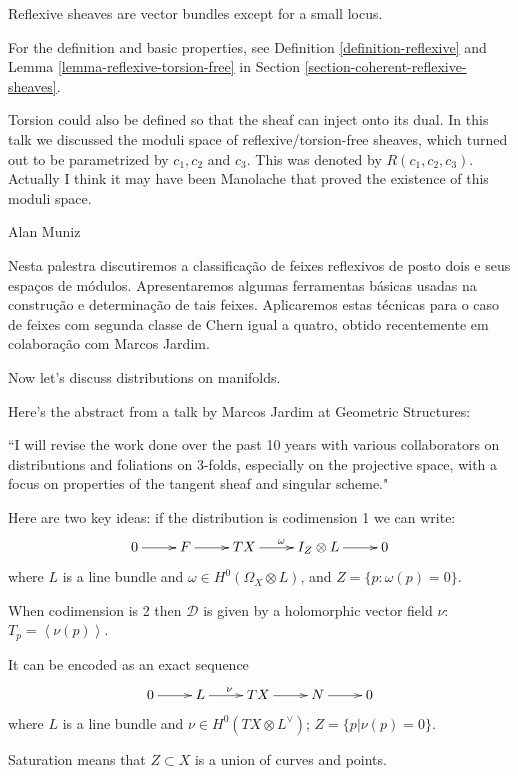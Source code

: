 \noindent
Reflexive sheaves
are vector bundles except for a small
locus.

For the definition and basic properties,
see Definition \ref{definition-reflexive}
and Lemma \ref{lemma-reflexive-torsion-free}
in Section
\ref{section-coherent-reflexive-sheaves}.

\begin{remark}
\label{remark-reflexive-talk}
Torsion could also be defined so that the
sheaf can inject onto its dual. In this talk
we discussed the moduli space of
reflexive/torsion-free sheaves, which turned
out to be parametrized by $c_1, c_2$ and
$c_3$. This was denoted by $R(c_1,c_2,c_3)$.
Actually I think it may have been Manolache
that proved the existence of this moduli
space.

Alan Muniz

Nesta palestra discutiremos a classificação
de feixes reflexivos de posto dois e seus
espaços de módulos. Apresentaremos algumas
ferramentas básicas usadas na construção e
determinação de tais feixes. Aplicaremos
estas técnicas para o caso de feixes com
segunda classe de Chern igual a quatro,
obtido recentemente em colaboração com Marcos
Jardim.
\end{remark}




\medskip\noindent
Now let's discuss
distributions on manifolds.

Here's the abstract from a talk by Marcos
Jardim at Geometric Structures:

``I will revise the work done over the past
10 years with various collaborators on
distributions and foliations on 3-folds,
especially on the projective space, with a
focus on properties of the tangent sheaf and
singular scheme."

Here are two key ideas: if the distribution
is codimension 1 we can write:
$$
\xymatrix{
0\ar[r]&F\ar[r]&TX\ar[r]^{\omega}&I_Z \otimes
L\ar[r]&0
}
$$
where $L$ is a line bundle and
$\omega \in H^{0}(\Omega_X \otimes L)$, and
$Z=\{p:\omega(p)=0\}$.

When codimension is 2 then $\mathcal{D}$ is
given by
a holomorphic vector field
$\nu$: $T_p=\left\langle{}\nu(p)\right\rangle{}$.

It can be encoded as an exact sequence
$$
\xymatrix{
	0\ar[r]&L\ar[r]^{\nu}&TX\ar[r]&N\ar[r]&0
}
$$
where $L$ is a line bundle
and $\nu \in H^{0}(TX \otimes L^\vee)$;
  $Z=\{p | \nu(p) = 0\}$.

\begin{remark}
\label{remark-stauration}
Saturation means that $Z \subset X$ is a
union
of curves and points.
\end{remark}


